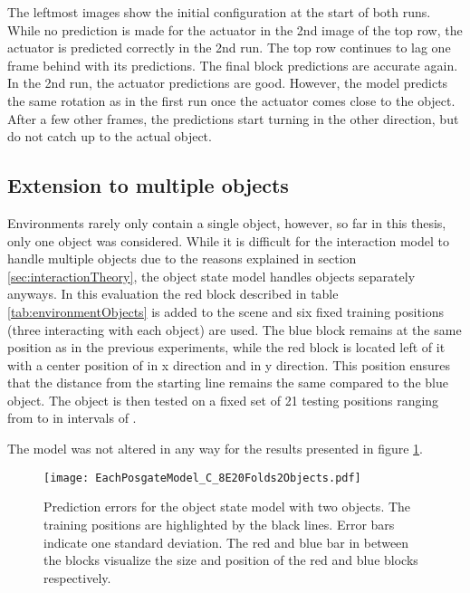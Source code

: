 The leftmost images show the initial configuration at the start of both runs. While no prediction is made for the actuator in the 2nd image of the top row, the actuator is predicted correctly in the 2nd run. The top row continues to lag one frame behind with its predictions. The final block predictions are accurate again.
In the 2nd run, the actuator predictions are good. However, the model predicts the same rotation as in the first run once the actuator comes close to the object. After a few other frames, the predictions start turning in the other direction, but do not catch up to the actual object.


\subsection{Extension to multiple objects \label{sec:multipleObjects}}

Environments rarely only contain a single object, however, so far in this thesis, only one object was considered. While it is difficult for the interaction model to handle multiple objects due to the reasons explained in section \ref{sec:interactionTheory}, the object state model handles objects separately anyways. In this evaluation the red block described in table \ref{tab:environmentObjects} is added to the scene and six fixed training positions (three interacting with each object) are used. The blue block remains at the same position as in the previous experiments, while the red block is located left of it with a center position of  in x direction and  in y direction. This position ensures that the distance from the starting line remains the same compared to the blue object.
The object is then tested on a fixed set of 21 testing positions ranging from  to  in intervals of .

The model was not altered in any way for the results presented in figure \ref{fig:eachPosTwoObjects}.

\begin{figure}
\centering
\texttt{[image: EachPosgateModel\_C\_8E20Folds2Objects.pdf]}
\caption{Prediction errors for the object state model with two objects. The training positions are highlighted by the black lines. Error bars indicate one standard deviation. The red and blue bar in between the blocks visualize the size and position of the red and blue blocks respectively.}
\label{fig:eachPosTwoObjects}
\end{figure}

